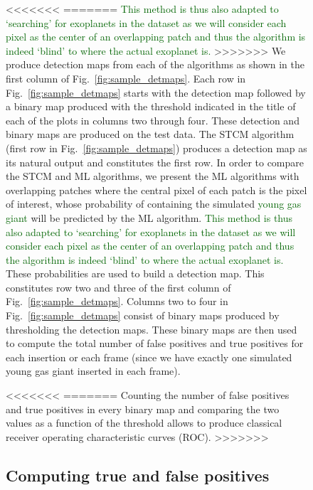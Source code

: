 \documentclass{aa}
\newcommand{\newchange}[1]{\textcolor{darkgreen}{#1}}
\begin{document}
{{{\begin{figure}[t]
<<<<<<<
=======
\newchange{This method is thus also adapted to `searching' for exoplanets in the dataset as we will consider each pixel as the center of an overlapping patch and thus the algorithm is indeed `blind' to where the actual exoplanet is.}
>>>>>>>
We produce detection maps from each of the algorithms as shown in the first column of Fig.~\ref{fig:sample_detmaps}.
Each row in Fig.~\ref{fig:sample_detmaps} starts with the detection map followed by a binary map produced with the threshold indicated in the title of each of the plots in columns two through four.
These detection and binary maps are produced on the test data.
The STCM algorithm (first row in Fig.~\ref{fig:sample_detmaps}) produces a detection map as its natural output and constitutes the first row.
In order to compare the STCM and ML algorithms, we present the ML algorithms with overlapping patches where the central pixel of each patch is the pixel of interest, whose probability of containing the simulated \newchange{young gas giant} will be predicted by the ML algorithm.
\newchange{This method is thus also adapted to `searching' for exoplanets in the dataset as we will consider each pixel as the center of an overlapping patch and thus the algorithm is indeed `blind' to where the actual exoplanet is.}
These probabilities are used to build a detection map.
This constitutes row two and three of the first column of Fig.~\ref{fig:sample_detmaps}.
Columns two to four in Fig.~\ref{fig:sample_detmaps} consist of binary maps produced by thresholding the detection maps.
These binary maps are then used to compute the total number of false positives and true positives for each insertion or each frame (since we have exactly one simulated young gas giant inserted in each frame).


<<<<<<<
=======
Counting the number of false positives and true positives in every binary map and comparing the two values as a function of the threshold allows to produce classical receiver operating characteristic curves (ROC). 
>>>>>>>
\subsection{Computing true and false positives}
\label{sec:TPFP}


\end{figure}}}}
\end{document}
